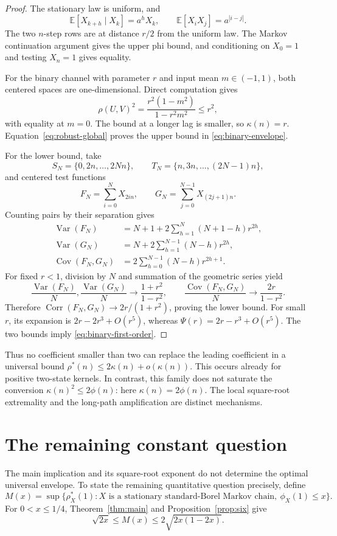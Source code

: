 \documentclass[11pt]{amsart}
\numberwithin{equation}{section}
\theoremstyle{definition}
\newcommand{\EE}{\mathbb E}
\newcommand{\Var}{\operatorname{Var}}
\newcommand{\Cov}{\operatorname{Cov}}
\newcommand{\Corr}{\operatorname{Corr}}
\newcommand{\rhostar}{\rho^{*}}
\begin{document}
\begin{proof}
The stationary law is uniform, and
\[
\EE[X_{k+h}\mid X_k]=a^hX_k,\qquad \EE[X_iX_j]=a^{|i-j|}.
\]
The two $n$-step rows are at distance $r/2$ from the uniform law. The Markov continuation argument gives the upper phi bound, and conditioning on $X_0=1$ and testing $X_n=1$ gives equality.

For the binary channel with parameter $r$ and input mean $m\in(-1,1)$, both centered spaces are one-dimensional. Direct computation gives
\[
\rho(U,V)^2=\frac{r^2(1-m^2)}{1-r^2m^2}\le r^2,
\]
with equality at $m=0$. The bound at a longer lag is smaller, so $\kappa(n)=r$. Equation~\eqref{eq:robust-global} proves the upper bound in \eqref{eq:binary-envelope}.

For the lower bound, take
\[
S_N=\{0,2n,\ldots,2Nn\},\qquad
T_N=\{n,3n,\ldots,(2N-1)n\},
\]
and centered test functions
\[
F_N=\sum_{i=0}^{N}X_{2in},\qquad
G_N=\sum_{j=0}^{N-1}X_{(2j+1)n}.
\]
Counting pairs by their separation gives
\begin{align*}
\Var(F_N)&=N+1+2\sum_{h=1}^{N}(N+1-h)r^{2h},\\
\Var(G_N)&=N+2\sum_{h=1}^{N-1}(N-h)r^{2h},\\
\Cov(F_N,G_N)&=2\sum_{h=0}^{N-1}(N-h)r^{2h+1}.
\end{align*}
For fixed $r<1$, division by $N$ and summation of the geometric series yield
\[
\frac{\Var(F_N)}N,\frac{\Var(G_N)}N\longrightarrow
\frac{1+r^2}{1-r^2},\qquad
\frac{\Cov(F_N,G_N)}N\longrightarrow\frac{2r}{1-r^2}.
\]
Therefore $\Corr(F_N,G_N)\to2r/(1+r^2)$, proving the lower bound. For small $r$, its expansion is $2r-2r^3+O(r^5)$, whereas $\Psi(r)=2r-r^3+O(r^5)$. The two bounds imply \eqref{eq:binary-first-order}.
\end{proof}

Thus no coefficient smaller than two can replace the leading coefficient in a universal bound $\rhostar(n)\le 2\kappa(n)+o(\kappa(n))$. This occurs already for positive two-state kernels. In contrast, this family does not saturate the conversion $\kappa(n)^2\le2\phi(n)$: here $\kappa(n)=2\phi(n)$. The local square-root extremality and the long-path amplification are distinct mechanisms.

\section{The remaining constant question}\label{sec:constant}

The main implication and its square-root exponent do not determine the optimal universal envelope. To state the remaining quantitative question precisely, define
\[
M(x)=\sup\{\rhostar_X(1): X\text{ is a stationary standard-Borel Markov chain},\ \phi_X(1)\le x\}.
\]
For $0<x\le1/4$, Theorem~\ref{thm:main} and Proposition~\ref{prop:six} give
\begin{equation}\label{eq:envelope}
\sqrt{2x}\le M(x)\le2\sqrt{2x(1-2x)}.
\end{equation}
\end{document}

